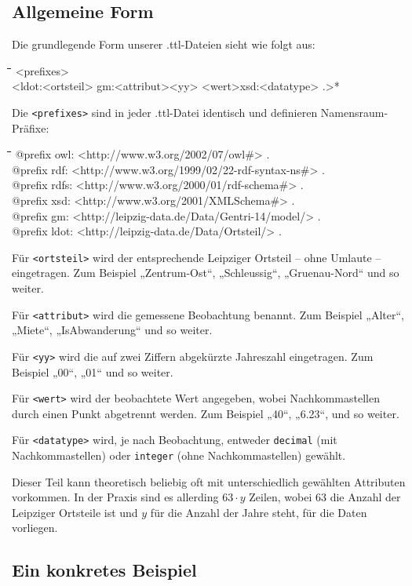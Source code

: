 \documentclass[a4paper,11pt]{article}
\newenvironment{code}{\tt \begin{tabbing}
\hskip12pt\=\hskip12pt\=\hskip12pt\=\hskip12pt\=\hskip5cm\=\hskip5cm\=\kill}
{\end{tabbing}}
\def\ppw{{\char94\char94}}
\begin{document}
\subsection{Allgemeine Form}

Die grundlegende Form unserer .ttl-Dateien sieht wie folgt aus:
\begin{code}
<prefixes>\\
<ldot:<ortsteil> gm:<attribut><yy> {\dq}<wert>{\dq}{\ppw}xsd:<datatype> .>*
\end{code}
Die \texttt{<prefixes>} sind in jeder .ttl-Datei identisch und definieren
Namensraum-Präfixe:
\begin{code}
@prefix owl:  <http://www.w3.org/2002/07/owl\#> .\\
@prefix rdf:  <http://www.w3.org/1999/02/22-rdf-syntax-ns\#> .\\
@prefix rdfs: <http://www.w3.org/2000/01/rdf-schema\#> .\\
@prefix xsd:  <http://www.w3.org/2001/XMLSchema\#> .\\
@prefix gm:   <http://leipzig-data.de/Data/Gentri-14/model/> .\\
@prefix ldot: <http://leipzig-data.de/Data/Ortsteil/> .
\end{code}
Für \texttt{<ortsteil>} wird der entsprechende Leipziger Ortsteil -- ohne
Umlaute -- eingetragen. Zum Beispiel „Zentrum-Ost“, „Schleussig“,
„Gruenau-Nord“ und so weiter.

Für \texttt{<attribut>} wird die gemessene Beobachtung benannt. Zum Beispiel
„Alter“, „Miete“, „IsAbwanderung“ und so weiter.

Für \texttt{<yy>} wird die auf zwei Ziffern abgekürzte Jahreszahl eingetragen.
Zum Beispiel „00“, „01“ und so weiter.

Für \texttt{<wert>} wird der beobachtete Wert angegeben, wobei
Nachkommastellen durch einen Punkt abgetrennt werden. Zum Beispiel „40“,
„6.23“, und so weiter.

Für \texttt{<datatype>} wird, je nach Beobachtung, entweder \texttt{decimal}
(mit Nachkommastellen) oder \texttt{integer} (ohne Nachkommastellen) gewählt.

Dieser Teil kann theoretisch beliebig oft mit unterschiedlich gewählten
Attributen vorkommen. In der Praxis sind es allerding $63 \cdot y$ Zeilen,
wobei 63 die Anzahl der Leipziger Ortsteile ist und $y$ für die Anzahl der
Jahre steht, für die Daten vorliegen.

\subsection{Ein konkretes Beispiel}
\end{document}
